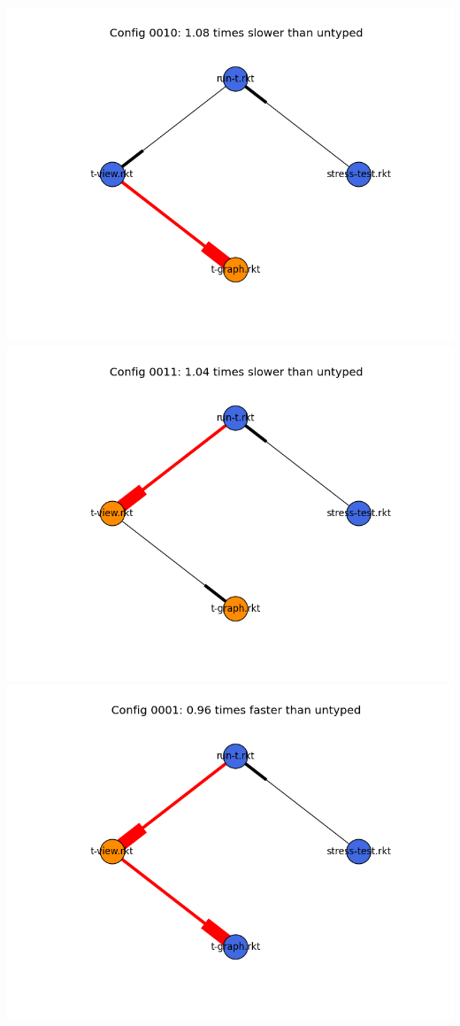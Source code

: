 \documentclass{article}
\begin{document}
\includegraphics[width=\textwidth]{mbta-04-20-ben-module-graph-0010.png}
\includegraphics[width=\textwidth]{mbta-04-20-ben-module-graph-0011.png}
\includegraphics[width=\textwidth]{mbta-04-20-ben-module-graph-0001.png}
\end{document}
